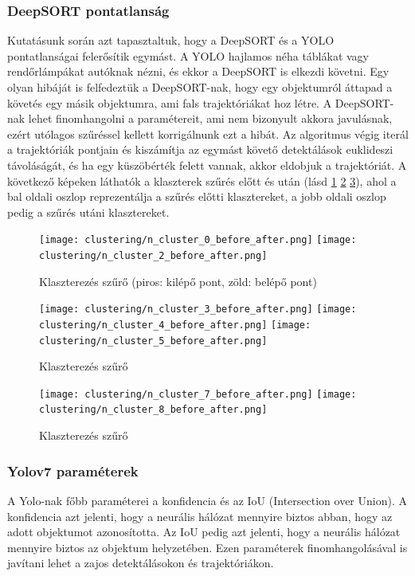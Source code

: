 \documentclass[12pt,a4paper]{article}
\begin{document}
\subsubsection{DeepSORT pontatlanság}
Kutatásunk során azt tapasztaltuk, hogy a DeepSORT és a YOLO pontatlanságai felerősítik egymást. A YOLO hajlamos néha táblákat
vagy rendőrlámpákat autóknak nézni, és ekkor a DeepSORT is elkezdi követni. Egy olyan hibáját is felfedeztük a DeepSORT-nak, hogy
egy objektumról áttapad a követés egy másik objektumra, ami fals trajektóriákat hoz létre. A DeepSORT-nak lehet finomhangolni a
paramétereit, ami nem bizonyult akkora javulásnak, ezért utólagos szűréssel kellett korrigálnunk ezt a hibát. Az algoritmus végig
iterál a trajektóriák pontjain és kiszámítja az egymást követő detektálások euklideszi távoláságát, és ha egy küszöbérték felett vannak, akkor eldobjuk a trajektóriát.
A következő képeken láthatók a klaszterek szűrés előtt és után (lásd \ref{fig: Klaszterezés szűrő} \ref{fig: Klaszterezés szűrő2} \ref{fig: Klaszterezés szűrő3}), ahol a bal oldali oszlop reprezentálja a szűrés előtti klasztereket, a jobb oldali oszlop pedig a szűrés utáni klasztereket.

\begin{figure}[htbp]
    \centering
    \texttt{[image: clustering/n\_cluster\_0\_before\_after.png]}
    \centering
    \texttt{[image: clustering/n\_cluster\_2\_before\_after.png]}
    \caption{Klaszterezés szűrő (piros: kilépő pont, zöld: belépő pont)}
    \label{fig: Klaszterezés szűrő}
\end{figure}
\begin{figure}[htbp]
    \centering
    \texttt{[image: clustering/n\_cluster\_3\_before\_after.png]}
    \centering
    \texttt{[image: clustering/n\_cluster\_4\_before\_after.png]}
    \centering
    \texttt{[image: clustering/n\_cluster\_5\_before\_after.png]}
    \caption{Klaszterezés szűrő}
    \label{fig: Klaszterezés szűrő2}
\end{figure}
\begin{figure}[htbp]
    \texttt{[image: clustering/n\_cluster\_7\_before\_after.png]}
    \texttt{[image: clustering/n\_cluster\_8\_before\_after.png]}
    \caption{Klaszterezés szűrő}
    \label{fig: Klaszterezés szűrő3}
\end{figure}

\subsubsection{Yolov7 paraméterek}
A Yolo-nak főbb paraméterei a konfidencia és az IoU (Intersection over Union). A konfidencia azt jelenti, hogy a neurális hálózat mennyire biztos abban, hogy az adott objektumot azonosította. 
Az IoU pedig azt jelenti, hogy a neurális hálózat mennyire biztos az objektum helyzetében. Ezen paraméterek finomhangolásával is javítani lehet a zajos detektálásokon és trajektóriákon.
\end{document}
